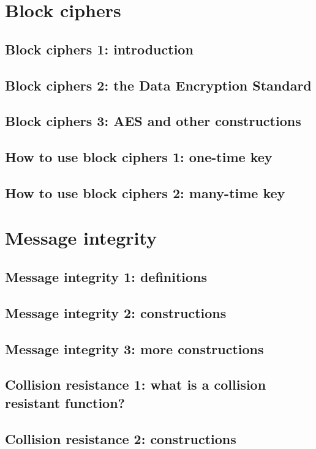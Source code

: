 \documentclass[10pt,a4paper]{report}
\begin{document}
\chapter{Block ciphers}

\section{Block ciphers 1: introduction}
\section{Block ciphers 2: the Data Encryption Standard}
\section{Block ciphers 3: AES and other constructions}
\section{How to use block ciphers 1: one-time key}
\section{How to use block ciphers 2: many-time key}

\chapter{Message integrity}

\section{Message integrity 1: definitions}
\section{Message integrity 2: constructions}
\section{Message integrity 3: more constructions}
\section{Collision resistance 1: what is a collision resistant function?}
\section{Collision resistance 2: constructions}
\end{document}
